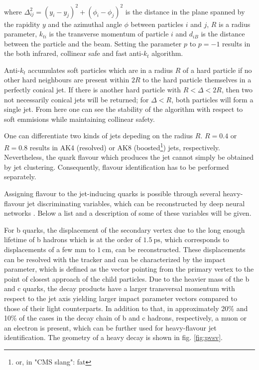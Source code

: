 where $\Delta^2_{ij} = (y_i-y_j)^2 + (\phi_i - \phi_j)^2$ is the distance in the plane spanned by the rapidity $y$ and the azimuthal angle $\phi$ between particles $i$ and $j$, $R$ is a radius parameter, $k_{ti}$ is the transverse momentum of particle $i$ and $d_{iB}$ is the distance between the particle and the beam. Setting the parameter $p$ to $p=-1$ results in the both infrared, collinear safe and fast anti-$k_t$ algorithm.

Anti-$k_t$ accumulates soft particles which are in a radius $R$ of a hard particle if no other hard neighbours are present within $2R$ to the hard particle themselves in a perfectly conical jet. If there is another hard particle with $R < \Delta<2R$, then two not necessarily conical jets will be returned; for $\Delta<R$, both particles will form a single jet. From here one can see the stability of the algorithm with respect to soft emmisions while maintaining collinear safety.

One can differentiate two kinds of jets depeding on the radius $R$. $R=0.4$ or $R=0.8$ results in AK4 (resolved) or AK8 (boosted\footnote{or, in "CMS slang": fat}) jets, respectively. Nevertheless, the quark flavour which produces the jet cannot simply be obtained by jet clustering. Consequently, flavour identification has to be performed separately.


Assigning flavour to the jet-inducing quarks is possible through several heavy-flavour jet discriminating variables, which can be reconstructed by deep neural networks \cite{Sirunyan_2018}. Below a list and a description of some of these variables will be given.

For b quarks, the displacement of the secondary vertex due to the long enough lifetime of b hadrons which is at the order of $\SI{1.5}{\pico\second}$, which corresponds to displacements of a few mm to $\SI{1}{\centi\meter}$, can be reconstructed. These displacements can be resolved with the tracker and can be characterized by the impact parameter, which is defined as the vector pointing from the primary vertex to the point of closest approach of the child particles. Due to the heavier mass of the b and c quarks, the decay products have a larger transversal momentum with respect to the jet axis yielding larger impact parameter vectors compared to those of their light counterparts. In addition to that, in approximately 20\% and 10\% of the cases in the decay chain of b and c hadrons, respectively, a muon or an electron is present, which can be further used for heavy-flavour jet identification. The geometry of a heavy decay is shown in fig. \ref{fig:pvsv}.

